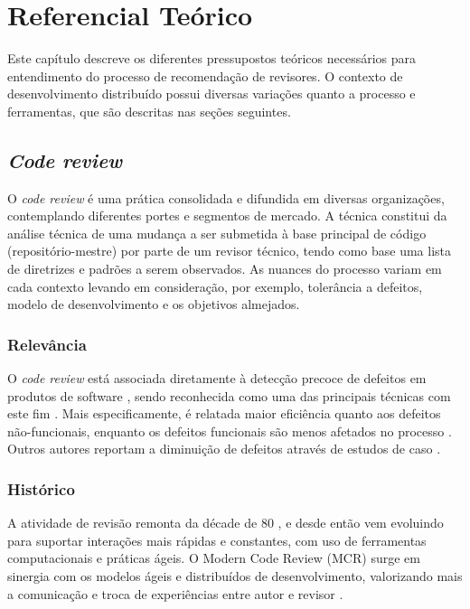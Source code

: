 \documentclass[a4paper,12pt]{monografia}
\theoremstyle{plain}
\theoremstyle{definition}
\theoremstyle{remark}
\begin{document}
\chapter{Referencial Teórico}\label{cha:referencial}

Este capítulo descreve os diferentes pressupostos teóricos necessários para entendimento do processo de recomendação de revisores. O contexto de desenvolvimento distribuído possui diversas variações quanto a processo e ferramentas, que são descritas nas seções seguintes.

\section{\textit{Code review}}\label{sec:code_review}
  O \textit{code review} é uma prática consolidada e difundida em diversas organizações, contemplando diferentes portes e segmentos de mercado. A técnica constitui da análise técnica de uma mudança a ser submetida à base principal de código (repositório-mestre) por parte de um revisor técnico, tendo como base uma lista de diretrizes e padrões a serem observados. As nuances do processo variam em cada contexto levando em consideração, por exemplo, tolerância a defeitos, modelo de desenvolvimento e os objetivos almejados.

\subsection{Relevância}\label{sec:relevancia}
  O \textit{code review} está associada diretamente à detecção precoce de defeitos em produtos de software \cite{schettino2014,Kemerer2009}, sendo reconhecida como uma das principais técnicas com este fim \cite{Boehm2001}. Mais especificamente, é relatada maior eficiência quanto aos defeitos não-funcionais, enquanto os defeitos funcionais são menos afetados no processo \cite{Beller2014202}. Outros autores reportam a diminuição de defeitos através de estudos de caso \cite{McIntosh2014192,Bavota201581,Morales2015171}.

\subsection{Histórico}\label{sec:historico}
  A atividade de revisão remonta da décade de 80 \cite{Fagan1976}, e desde então vem evoluindo para suportar interações mais rápidas e constantes, com uso de ferramentas computacionais e práticas ágeis. O Modern Code Review (MCR) surge em sinergia com os modelos ágeis e distribuídos de desenvolvimento, valorizando mais a comunicação e troca de experiências entre autor e revisor \cite{Bacchelli2013}.
\end{document}

